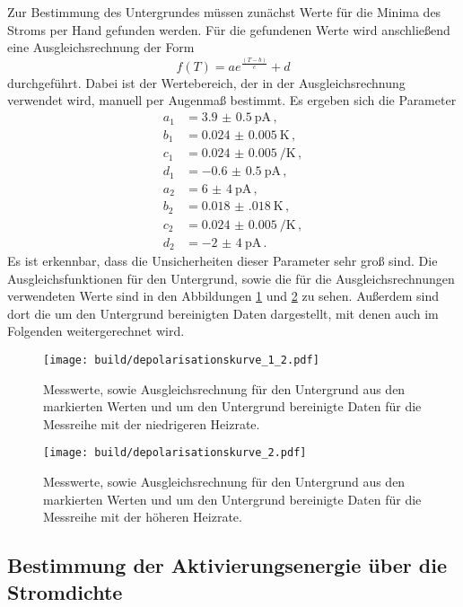 Zur Bestimmung des Untergrundes müssen zunächst Werte für die Minima des Stroms per Hand gefunden
werden. Für die gefundenen Werte wird anschließend eine Ausgleichsrechnung der
Form
\begin{equation*}
  f(T)=a e^{\frac{(T-b)}{c}} +d
\end{equation*}
durchgeführt. Dabei ist der Wertebereich, der in der Ausgleichsrechnung verwendet wird,
manuell per Augenmaß bestimmt. Es ergeben sich die Parameter
\begin{align*}
  a_1&=\SI{3.9(05)}{\pico\ampere}  \,,\\
  b_1&=\SI{0.024(0005)}{\kelvin}  \,,\\
	c_1&=\SI{0.024(0005)}{\per\kelvin}  \,,\\
  d_1&=\SI{-0.6(05)}{\pico\ampere}  \,,\\
  a_2&=\SI{6(4)}{\pico\ampere}  \,,\\
  b_2&=\SI{0.018(018)}{\kelvin}  \,,\\
	c_2&=\SI{0.024(0005)}{\per\kelvin}  \,,\\
  d_2&=\SI{-2(4)}{\pico\ampere}  \,.
\end{align*}
Es ist erkennbar, dass die Unsicherheiten dieser Parameter sehr groß sind.
Die Ausgleichsfunktionen für den Untergrund, sowie die für die Ausgleichsrechnungen
verwendeten Werte sind in den Abbildungen \ref{fig:depol1} und \ref{fig:depol2} zu sehen.
Außerdem sind dort die um den Untergrund bereinigten Daten dargestellt, mit denen auch
im Folgenden weitergerechnet wird.

\begin{figure}
  \centering
  \texttt{[image: build/depolarisationskurve\_1\_2.pdf]}
  \caption{Messwerte, sowie Ausgleichsrechnung für den Untergrund aus den markierten Werten
  und um den Untergrund bereinigte Daten für die Messreihe mit der niedrigeren Heizrate.}
  \label{fig:depol1}
\end{figure}
\begin{figure}
  \centering
  \texttt{[image: build/depolarisationskurve\_2.pdf]}
  \caption{Messwerte, sowie Ausgleichsrechnung für den Untergrund aus den markierten Werten
  und um den Untergrund bereinigte Daten für die Messreihe mit der höheren Heizrate.
	\cite{wieso haben wir hier dieses komische Maximum?.}}
  \label{fig:depol2}
\end{figure}

\newpage
\subsection{Bestimmung der Aktivierungsenergie über die Stromdichte}

